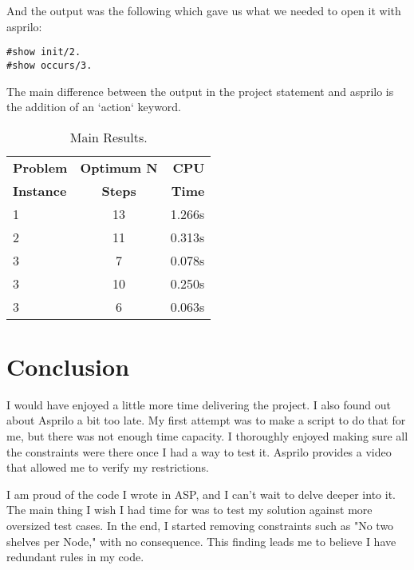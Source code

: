 \documentclass[letterpaper]{article} %
\begin{document}
And the output was the following which gave us what we needed to open it with asprilo:

\begin{lstlisting}[numbers=none,language=clingo]
#show init/2.
#show occurs/3.
\end{lstlisting}

The main difference between the output in the project statement\cite{cse579:CourseProject} and asprilo\cite{cse579:asprilo} is the addition of an `action` keyword.

\begin{table}[h!]
  \begin{center}
    \caption{Main Results.}
    \label{tab:table1}
    \begin{tabular}{l|c|r} %
      \textbf{Problem} & \textbf{Optimum N} & \textbf{CPU}\\
      \textbf{Instance} & \textbf{Steps} & \textbf{Time}\\
      \hline
      1 & 13 & 1.266s\\
      2 & 11 & 0.313s\\
      3 & 7 & 0.078s\\
      3 & 10 & 0.250s\\
      3 & 6 & 0.063s\\
    \end{tabular}
  \end{center}
\end{table}

\section{Conclusion}

I would have enjoyed a little more time delivering the project. I also found out about Asprilo a bit too late. My first attempt was to make a script to do that for me, but there was not enough time capacity. I thoroughly enjoyed making sure all the constraints were there once I had a way to test it. Asprilo provides a video that allowed me to verify my restrictions. 

I am proud of the code I wrote in ASP, and I can't wait to delve deeper into it. The main thing I wish I had time for was to test my solution against more oversized test cases. In the end, I started removing constraints such as "No two shelves per Node," with no consequence. This finding leads me to believe I have redundant rules in my code.
\end{document}
